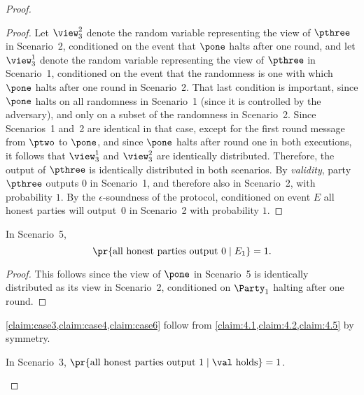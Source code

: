 \begin{proof}
\begin{proof}
Let $\view_3^2$ denote the random variable representing the view of $\pthree$ in Scenario~2, conditioned on the event that $\pone$ halts after one round, and let $\view_3^1$ denote the random variable representing the view of $\pthree$ in Scenario~1, conditioned on the event that the randomness is one with which $\pone$ halts after one round in Scenario~2. That last condition is important, since $\pone$ halts on all randomness in Scenario~1 (since it is controlled by the adversary), and only on a subset of the randomness in Scenario~2. Since Scenarios~1 and~2 are identical in that case, except for the first round message from $\ptwo$ to $\pone$, and since $\pone$ halts after round one in both executions, it follows that $\view_3^1$ and $\view_3^2$ are identically distributed. Therefore, the output of $\pthree$ is identically distributed in both scenarios. By \emph{validity}, party $\pthree$ outputs $0$ in Scenario~1, and therefore also in Scenario~2, with probability $1$.  By the $\epsilon$-soundness of the protocol, conditioned on event $E$  all honest parties will output~$0$ in Scenario~2 with probability $1$.
\end{proof}

\begin{claim}\label{claim4.3}
In Scenario~5,
\[
\pr{\text{all honest parties output } 0 \mid E_1} =  1.
\]
\end{claim}
\begin{proof}
This follows since the view of $\pone$ in Scenario~5 is identically distributed as its view in Scenario~2, conditioned on $\Party_1$ halting after one round.
\end{proof}

\cref{claim:case3,claim:case4,claim:case6} follow from \cref{claim:4.1,claim:4.2,claim:4.5} by symmetry. 
\begin{claim}\label{claim:case3}
In Scenario~3, $\pr{\text{all honest parties output } 1 \mid \text{\val holds}} = 1$.
\end{claim}


\end{proof}
